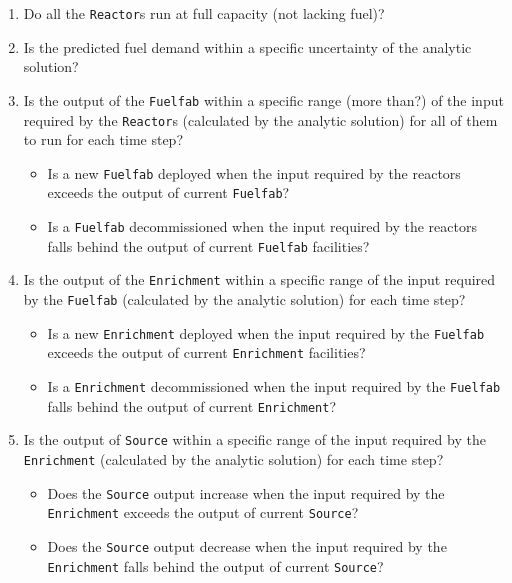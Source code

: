 \documentclass[12pt,letterpaper]{article}
\begin{document}
\begin{enumerate}
\item  Do all the \texttt{Reactor}s run at full capacity (not lacking fuel)? 

\item Is the predicted fuel demand within a specific uncertainty of the analytic solution? 

\item  Is the output of the \texttt{Fuelfab} within a specific range (more than?) of the input required by the \texttt{Reactor}s (calculated by the analytic solution) for all of them to run for each time step? 
\begin{itemize}
\item Is a new \texttt{Fuelfab} deployed when the input required by the reactors exceeds the output of current \texttt{Fuelfab}?

\item Is a \texttt{Fuelfab} decommissioned when the input required by the reactors falls behind the output of current \texttt{Fuelfab} facilities?
\end{itemize}

\item  Is the output of the \texttt{Enrichment} within a specific range of the input required by the \texttt{Fuelfab} (calculated by the analytic solution) for each time step? 
\begin{itemize}
\item Is a new \texttt{Enrichment} deployed when the input required by the \texttt{Fuelfab} exceeds the output of current \texttt{Enrichment} facilities?
\item Is a \texttt{Enrichment} decommissioned when the input required by the \texttt{Fuelfab} falls behind the output of current \texttt{Enrichment}?
\end{itemize}

\item Is the output of \texttt{Source} within a specific range of the input required by the \texttt{Enrichment} (calculated by the analytic solution) for each time step? 
\begin{itemize}
\item Does the \texttt{Source} output increase when the input required by the \texttt{Enrichment} exceeds the output of current \texttt{Source}?
\item Does the \texttt{Source} output decrease when the input required by the \texttt{Enrichment} falls behind the output of current \texttt{Source}?
\end{itemize}


\end{enumerate}
\end{document}
